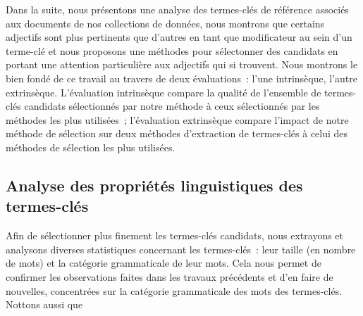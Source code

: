     Dans la suite, nous présentons une analyse des termes-clés de référence
    associés aux documents de nos collections de données, nous montrons que
    certains adjectifs sont plus pertinents que d'autres en tant que
    modificateur au sein d'un terme-clé et nous proposons une méthodes pour
    sélectonner des candidats en portant une attention particulière aux
    adjectifs qui si trouvent. Nous montrons le bien fondé de ce travail au
    travers de deux évaluations~: l'une intrinsèque, l'autre extrinsèque.
    L'évaluation intrinsèque compare la qualité de l'ensemble de termes-clés
    candidats sélectionnés par notre méthode à ceux sélectionnés par les
    méthodes les plus utilisées~; l'évaluation extrinsèque compare l'impact de
    notre méthode de sélection sur deux méthodes d'extraction de termes-clés à
    celui des méthodes de sélection les plus utilisées.

    \subsection{Analyse des propriétés linguistiques des termes-clés}
    \label{subsec:main-automatic_keyphrase_annotation-keyphrase_candidate_selection-analysis_of_keyphrase_properties}
      Afin de sélectionner plus finement les termes-clés candidats, nous
      extrayons et analysons diverses statistiques concernant les termes-clés~:
      leur taille (en nombre de mots) et la catégorie grammaticale de leur mots.
      Cela nous permet de confirmer les observations faites dans les travaux
      précédents et d'en faire de nouvelles, concentrées sur la catégorie
      grammaticale des mots des termes-clés. Nottons aussi que

